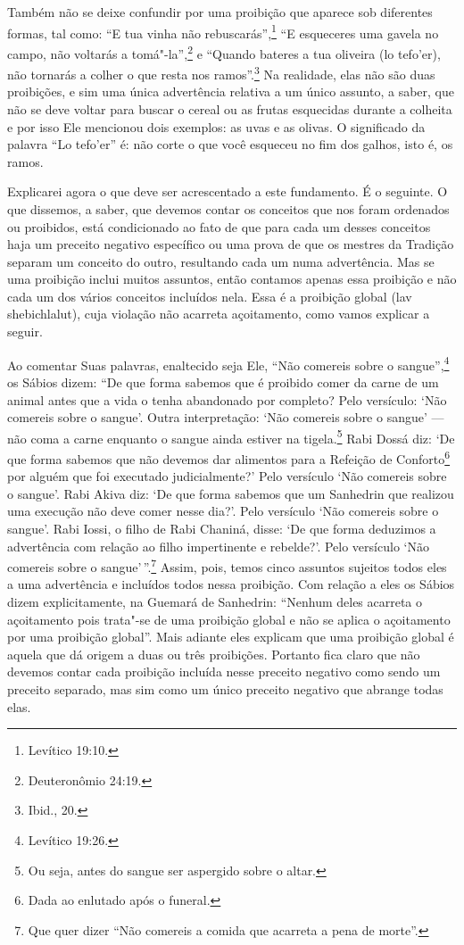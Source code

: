 Também não se deixe confundir por uma proibição que aparece sob
diferentes formas, tal como: ``E tua vinha não rebuscarás'',\footnote{Levítico
19:10.} ``E esqueceres uma gavela no campo, não voltarás a tomá"-la'',\footnote{Deuteronômio 24:19.} e ``Quando bateres a tua oliveira (lo tefo'er),
não tornarás a colher o que resta nos ramos''.\footnote{Ibid., 20.} Na realidade,
elas não são duas proibições, e sim uma única advertência relativa a um
único assunto, a saber, que não se deve voltar para buscar o cereal ou
as frutas esquecidas durante a colheita e por isso Ele mencionou dois
exemplos: as uvas e as olivas. O significado da palavra ``Lo tefo'er''
é: não corte o que você esqueceu no fim dos galhos, isto é, os ramos.

Explicarei agora o que deve ser acrescentado a este fundamento. É o
seguinte. O que dissemos, a saber, que devemos contar os conceitos que
nos foram ordenados ou proibidos, está condicionado ao fato de que para
cada um desses conceitos haja um preceito negativo específico ou uma
prova de que os mestres da Tradição separam um conceito do outro,
resultando cada um numa advertência. Mas se uma proibição inclui muitos
assuntos, então contamos apenas essa proibição e não cada um dos vários
conceitos incluídos nela. Essa é a proibição global (lav shebichlalut\starr),
cuja violação não acarreta açoitamento, como vamos explicar a seguir.

Ao comentar Suas palavras, enaltecido seja Ele, ``Não comereis sobre o
sangue'',\footnote{Levítico 19:26.} os Sábios dizem: ``De que forma sabemos que é
proibido comer da carne de um animal antes que a vida o tenha abandonado
por completo? Pelo versículo: `Não comereis sobre o sangue'. Outra
interpretação: `Não comereis sobre o sangue' --- não coma a carne
enquanto o sangue ainda estiver na tigela.\footnote{Ou seja, antes do sangue ser aspergido sobre o altar.} Rabi
Dossá\starr{} diz: `De que forma sabemos que não devemos dar alimentos para a
Refeição de Conforto\footnote{Dada ao enlutado após o funeral.} por alguém que foi executado
judicialmente?' Pelo versículo `Não comereis sobre o sangue'. Rabi Akiva\starr{}
diz: `De que forma sabemos que um Sanhedrin\starr{} que realizou uma execução
não deve comer nesse dia?'. Pelo versículo `Não comereis sobre o
sangue'. Rabi Iossi\starr, o filho de Rabi Chaniná\starr, disse: `De que forma
deduzimos a advertência com relação ao filho impertinente e rebelde?'.
Pelo versículo `Não comereis sobre o sangue'\,''.\footnote{Que quer dizer ``Não comereis a comida que acarreta a pena de
  morte''.}
Assim, pois, temos cinco assuntos sujeitos todos eles a uma advertência
e incluídos todos nessa proibição. Com relação a eles os Sábios dizem
explicitamente, na Guemará\starr{} de Sanhedrin\starr: ``Nenhum deles acarreta o
açoitamento pois trata"-se de uma proibição global e não se aplica o
açoitamento por uma proibição global''. Mais adiante eles explicam que
uma proibição global é aquela que dá origem a duas ou três proibições.
Portanto fica claro que não devemos contar cada proibição incluída
nesse preceito negativo como sendo um preceito separado, mas sim como um
único preceito negativo que abrange todas elas.


